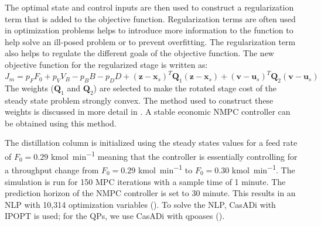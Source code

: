 The optimal state and control inputs are then used to construct a regularization term that is added to the objective function.
Regularization terms are often used in optimization problems  helps to introduce more information to the function to help solve an ill-posed problem or to prevent overfitting.
The regularization term also helps to regulate the different goals of the objective function.
The new objective function for the regularized stage is written as:
\begin{equation}
	J_m = p_FF_0 + p_VV_B-p_BB-p_DD+(\boldsymbol{z}-\boldsymbol{x}_s)^T\boldsymbol{Q}_1(\boldsymbol{z}-\boldsymbol{x}_s)+(\boldsymbol{v}-\boldsymbol{u}_s)^T\boldsymbol{Q}_2(\boldsymbol{v}-\boldsymbol{u}_s)
\end{equation}
The weights ($\boldsymbol{Q}_1$ and $\boldsymbol{Q}_2$) are selected to make the rotated stage cost of the steady state problem strongly convex. 
The method used to construct these weights is discussed in more detail in \cite{fast}.
A stable economic NMPC controller can be obtained using this method.
\par
The distillation column is initialized using the steady states values for a feed rate of $F_0 = 0.29$ \si{\kilo\mole\per\minute} meaning that the controller is essentially controlling for a throughput change from $F_0 = 0.29$ \si{\kilo\mole\per\minute} to $F_0 = 0.30$ \si{\kilo\mole\per\minute}.
The simulation is run for 150 MPC iterations with a sample time of 1 minute.
The prediction horizon of the NMPC controller is set to 30 minute.
This results in an NLP with 10,314 optimization variables (\cite{economic}).
To solve the NLP, CasADi with IPOPT is used; for the QPs, we use CasADi with qpoases (\cite{Andersson2013b}).

